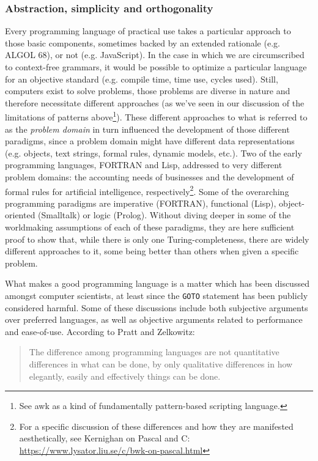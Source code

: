 \subsubsection{Abstraction, simplicity and orthogonality}
\label{subsubsec:theoretical-qualities-programming-languages}

Every programming language of practical use takes a particular approach to those basic components, sometimes backed by an extended rationale (e.g. ALGOL 68), or not (e.g. JavaScript). In the case in which we are circumscribed to context-free grammars, it would be possible to optimize a particular language for an objective standard (e.g. compile time, time use, cycles used). Still, computers exist to solve problems, those problems are diverse in nature and therefore necessitate different approaches (as we've seen in our discussion of the limitations of patterns above\footnote{See awk as a kind of fundamentally pattern-based scripting language.}). These different approaches to what is referred to as the \emph{problem domain} in turn influenced the development of those different paradigms, since a problem domain might have different data representations (e.g. objects, text strings, formal rules, dynamic models, etc.). Two of the early programming languages, FORTRAN and Lisp, addressed to very different problem domains: the accounting needs of businesses and the development of formal rules for artificial intelligence, respectively\footnote{For a specific discussion of these differences and how they are manifested aesthetically, see Kernighan on Pascal and C: \url{https://www.lysator.liu.se/c/bwk-on-pascal.html}}. Some of the overarching programming paradigms are imperative (FORTRAN), functional (Lisp), object-oriented (Smalltalk) or logic (Prolog). Without diving deeper in some of the worldmaking assumptions of each of these paradigms, they are here sufficient proof to show that, while there is only one Turing-completeness, there are widely different approaches to it, some being better than others when given a specific problem.

What makes a good programming language is a matter which has been discussed amongst computer scientists, at least since the \lstinline{GOTO} statement has been publicly considered harmful. Some of these discussions include both subjective arguments over preferred languages, as well as objective arguments related to performance and ease-of-use. According to Pratt and Zelkowitz:

\begin{quote}
  The difference among programming languages are not quantitative differences in what can be done, by only qualitative differences in how elegantly, easily and effectively things can be done. \citep{pratt_programming_2000}
\end{quote}

